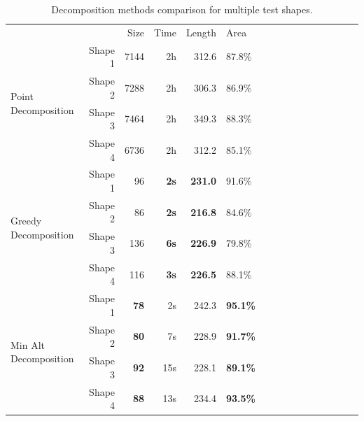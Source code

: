 \documentclass[../main.tex]{subfiles}
\begin{document}
\begin{table}
	\centering
	\caption{Decomposition methods comparison for multiple test shapes.}
	\label{table:performance}
	\begin{tabular}{@{} l rrrr l rrrr l rrrr l@{}}
		\toprule
		&& Size & Time & Length & Area \\
		\cmidrule{3-6}
		\multirow{4}{*}{Point Decomposition} & Shape 1 & 7144 & 2h & 312.6 & 87.8\%\\
		& Shape 2 & 7288  & 2h & 306.3 & 86.9\%\\
		& Shape 3 & 7464 & 2h & 349.3 & 88.3\%\\
		& Shape 4 & 6736 & 2h & 312.2 & 85.1\%\\
		\midrule
		\multirow{4}{*}{Greedy Decomposition} & Shape 1 & 96 & \bf{2s} & \bf{231.0} & 91.6\%\\
		& Shape 2 & 86 & \bf{2s} & \bf{216.8} & 84.6\%\\
		& Shape 3 & 136 & \bf{6s} & \bf{226.9} & 79.8\%\\
		& Shape 4 & 116 & \bf{3s} & \bf{226.5} & 88.1\%\\
		\midrule
		\multirow{4}{*}{Min Alt Decomposition} & Shape 1 & \bf{78} & 2s & 242.3 & \bf{95.1\%}\\
		& Shape 2 & \bf{80} & 7s & 228.9 & \bf{91.7\%} \\
		& Shape 3 & \bf{92} & 15s & 228.1 & \bf{89.1\%} \\
		& Shape 4 & \bf{88} & 13s & 234.4 & \bf{93.5\%}\\
		\bottomrule

	\end{tabular}
\end{table}

\end{document}
